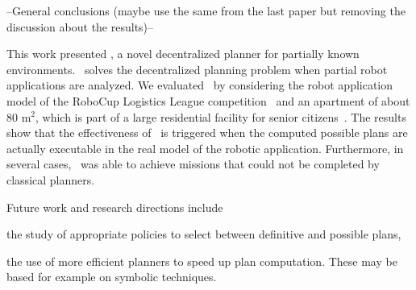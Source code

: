 --General conclusions (maybe use the same from the last paper but removing the discussion about the results)--

This work presented  \toolName, a novel decentralized planner for partially known environments.
\toolName\ solves the decentralized planning problem when partial robot applications are analyzed.
We evaluated \toolName\ by considering the robot application model of the RoboCup Logistics League competition~\cite{karrasrobocup} and an apartment of about 80 m$^2$, which is part of a large residential facility for senior citizens~\cite{map}.
The results show that the effectiveness of \toolName\ is triggered when the computed possible plans are actually executable in the real model of the robotic application.
Furthermore, in several cases, \toolName\ was able to achieve missions that could not be completed by classical planners.

Future work and research directions include
\begin{enumerate*}
\item the study of appropriate policies to select between definitive and possible plans, %
\item the use of more efficient planners to speed up plan computation.
These may be based for example on symbolic techniques.
\end{enumerate*}
